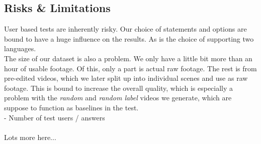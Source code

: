 \subsection{Risks \& Limitations}
%
User based tests are inherently risky. Our choice of statements and options are bound to have a huge influence on the results. As is the choice of supporting two languages.\\
The size of our dataset is also a problem. We only have a little bit more than an hour of usable footage. Of this, only a part is actual raw footage. The rest is from pre-edited videos, which we later split up into individual scenes and use as raw footage. This is bound to increase the overall quality, which is especially a problem with the \textit{random} and \textit{random label} videos we generate, which are suppose to function as baselines in the test.\\
- Number of test users / answers
\\\\
%
Lots more here...
%
